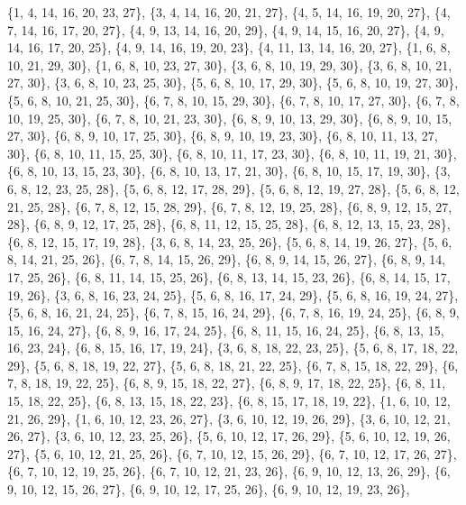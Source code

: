 \documentclass[11pt,a4paper]{article}
\begin{document}
{\{1, 4, 14, 16, 20, 23, 27\}, \{3, 4, 14, 16, 20, 21, 27\}, \{4, 5, 14, 16, 19, 20, 27\}, \{4, 7, 14, 16, 17, 20, 27\}, \{4, 9, 13, 14, 16, 20, 29\},
\{4, 9, 14, 15, 16, 20, 27\}, \{4, 9, 14, 16, 17, 20, 25\}, \{4, 9, 14, 16, 19, 20, 23\}, \{4, 11, 13, 14, 16, 20, 27\}, \{1, 6, 8, 10, 21, 29, 30\},
\{1, 6, 8, 10, 23, 27, 30\}, \{3, 6, 8, 10, 19, 29, 30\}, \{3, 6, 8, 10, 21, 27, 30\}, \{3, 6, 8, 10, 23, 25, 30\}, \{5, 6, 8, 10, 17, 29, 30\},
\{5, 6, 8, 10, 19, 27, 30\}, \{5, 6, 8, 10, 21, 25, 30\}, \{6, 7, 8, 10, 15, 29, 30\}, \{6, 7, 8, 10, 17, 27, 30\}, \{6, 7, 8, 10, 19, 25, 30\},
\{6, 7, 8, 10, 21, 23, 30\}, \{6, 8, 9, 10, 13, 29, 30\}, \{6, 8, 9, 10, 15, 27, 30\}, \{6, 8, 9, 10, 17, 25, 30\}, \{6, 8, 9, 10, 19, 23, 30\},
\{6, 8, 10, 11, 13, 27, 30\}, \{6, 8, 10, 11, 15, 25, 30\}, \{6, 8, 10, 11, 17, 23, 30\}, \{6, 8, 10, 11, 19, 21, 30\}, \{6, 8, 10, 13, 15, 23, 30\},
\{6, 8, 10, 13, 17, 21, 30\}, \{6, 8, 10, 15, 17, 19, 30\}, \{3, 6, 8, 12, 23, 25, 28\}, \{5, 6, 8, 12, 17, 28, 29\}, \{5, 6, 8, 12, 19, 27, 28\},
\{5, 6, 8, 12, 21, 25, 28\}, \{6, 7, 8, 12, 15, 28, 29\}, \{6, 7, 8, 12, 19, 25, 28\}, \{6, 8, 9, 12, 15, 27, 28\}, \{6, 8, 9, 12, 17, 25, 28\},
\{6, 8, 11, 12, 15, 25, 28\}, \{6, 8, 12, 13, 15, 23, 28\}, \{6, 8, 12, 15, 17, 19, 28\}, \{3, 6, 8, 14, 23, 25, 26\}, \{5, 6, 8, 14, 19, 26, 27\},
\{5, 6, 8, 14, 21, 25, 26\}, \{6, 7, 8, 14, 15, 26, 29\}, \{6, 8, 9, 14, 15, 26, 27\}, \{6, 8, 9, 14, 17, 25, 26\}, \{6, 8, 11, 14, 15, 25, 26\},
\{6, 8, 13, 14, 15, 23, 26\}, \{6, 8, 14, 15, 17, 19, 26\}, \{3, 6, 8, 16, 23, 24, 25\}, \{5, 6, 8, 16, 17, 24, 29\}, \{5, 6, 8, 16, 19, 24, 27\},
\{5, 6, 8, 16, 21, 24, 25\}, \{6, 7, 8, 15, 16, 24, 29\}, \{6, 7, 8, 16, 19, 24, 25\}, \{6, 8, 9, 15, 16, 24, 27\}, \{6, 8, 9, 16, 17, 24, 25\},
\{6, 8, 11, 15, 16, 24, 25\}, \{6, 8, 13, 15, 16, 23, 24\}, \{6, 8, 15, 16, 17, 19, 24\}, \{3, 6, 8, 18, 22, 23, 25\}, \{5, 6, 8, 17, 18, 22, 29\},
\{5, 6, 8, 18, 19, 22, 27\}, \{5, 6, 8, 18, 21, 22, 25\}, \{6, 7, 8, 15, 18, 22, 29\}, \{6, 7, 8, 18, 19, 22, 25\}, \{6, 8, 9, 15, 18, 22, 27\},
\{6, 8, 9, 17, 18, 22, 25\}, \{6, 8, 11, 15, 18, 22, 25\}, \{6, 8, 13, 15, 18, 22, 23\}, \{6, 8, 15, 17, 18, 19, 22\}, \{1, 6, 10, 12, 21, 26, 29\},
\{1, 6, 10, 12, 23, 26, 27\}, \{3, 6, 10, 12, 19, 26, 29\}, \{3, 6, 10, 12, 21, 26, 27\}, \{3, 6, 10, 12, 23, 25, 26\}, \{5, 6, 10, 12, 17, 26, 29\},
\{5, 6, 10, 12, 19, 26, 27\}, \{5, 6, 10, 12, 21, 25, 26\}, \{6, 7, 10, 12, 15, 26, 29\}, \{6, 7, 10, 12, 17, 26, 27\}, \{6, 7, 10, 12, 19, 25, 26\},
\{6, 7, 10, 12, 21, 23, 26\}, \{6, 9, 10, 12, 13, 26, 29\}, \{6, 9, 10, 12, 15, 26, 27\}, \{6, 9, 10, 12, 17, 25, 26\}, \{6, 9, 10, 12, 19, 23, 26\},
}
\end{document}
